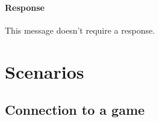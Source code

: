 \documentclass[a4paper]{article}
\begin{document}
	\paragraph{Response} This message doesn't require a response.

	\pagebreak

	\section{Scenarios}

	\subsection{Connection to a game}

	\begin{center}
		\begin{sequencediagram}


\end{sequencediagram}
\end{center}
\end{document}
